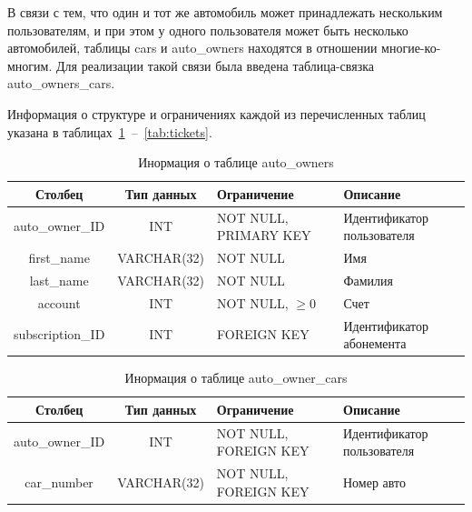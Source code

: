 В связи с тем, что один и тот же автомобиль может принадлежать нескольким пользователям, и при этом у одного пользователя может быть несколько автомобилей, таблицы cars и auto\_owners  находятся в отношении многие-ко-многим. Для реализации такой связи была введена таблица-связка auto\_owners\_cars.

Информация о структуре и ограничениях каждой из перечисленных таблиц указана в таблицах~\ref{tab:users}~--~\ref{tab:tickets}.

\begin{table}[H]
	\begin{center}
		\begin{center}
			\caption{\label{tab:users}Инормация о таблице auto\_owners}
		\end{center}
		\begin{tabular}{|c|c|p{3cm}|p{4cm}|}
			\hline 
			Столбец & Тип данных & Ограничение & Описание \\ \hline
			auto\_owner\_ID & INT & NOT NULL, PRIMARY KEY & Идентификатор
пользователя \\ \hline
	        first\_name &  VARCHAR(32)  & NOT NULL & Имя  \\ \hline
	        last\_name &  VARCHAR(32) & NOT NULL & Фамилия  \\ \hline
	        account & INT & NOT NULL, \( \geq 0\) & Счет  \\ \hline
	        subscription\_ID & INT & FOREIGN KEY & Идентификатор абонемента \\ \hline
		\end{tabular}
	\end{center}
\end{table}

\begin{table}[H]
	\begin{center}
		\begin{center}
			\caption{\label{tab:aoc}Инормация о таблице auto\_owner\_cars}
		\end{center}
		\begin{tabular}{|c|c|p{3cm}|p{4cm}|}
			\hline 
			Столбец & Тип данных & Ограничение & Описание \\ \hline
	        auto\_owner\_ID & INT & NOT NULL, FOREIGN KEY & Идентификатор
пользователя  \\ \hline
	        car\_number & VARCHAR(32) & NOT NULL, FOREIGN KEY & Номер авто \\ \hline
		\end{tabular}
	\end{center}
\end{table}

